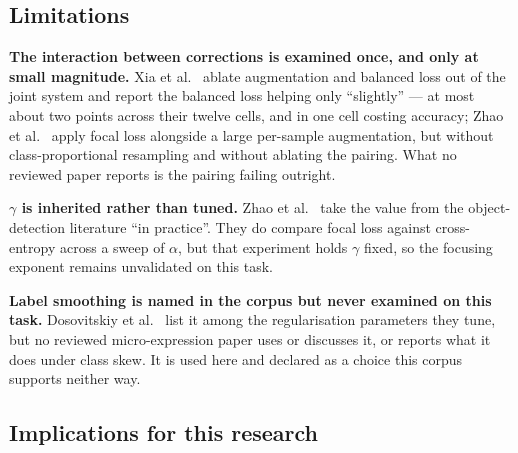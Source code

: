 \subsection{Limitations}
\label{sec:imbalance-limitations}

\textbf{The interaction between corrections is examined once, and only at small magnitude.} Xia et al.~\cite{xia2020a} ablate augmentation and balanced loss out of the joint system and report the balanced loss helping only ``slightly'' --- at most about two points across their twelve cells, and in one cell costing accuracy; Zhao et al.~\cite{zhaoS2021} apply focal loss alongside a large per-sample augmentation, but without class-proportional resampling and without ablating the pairing. What no reviewed paper reports is the pairing failing outright.

\textbf{$\gamma$ is inherited rather than tuned.} Zhao et al.~\cite{zhaoS2021} take the value from the object-detection literature ``in practice''. They do compare focal loss against cross-entropy across a sweep of $\alpha$, but that experiment holds $\gamma$ fixed, so the focusing exponent remains unvalidated on this task.

\textbf{Label smoothing is named in the corpus but never examined on this task.} Dosovitskiy et al.~\cite{dosovitskiy2021} list it among the regularisation parameters they tune, but no reviewed micro-expression paper uses or discusses it, or reports what it does under class skew. It is used here and declared as a choice this corpus supports neither way.

\subsection{Implications for this research}
\label{sec:imbalance-double-correction}

